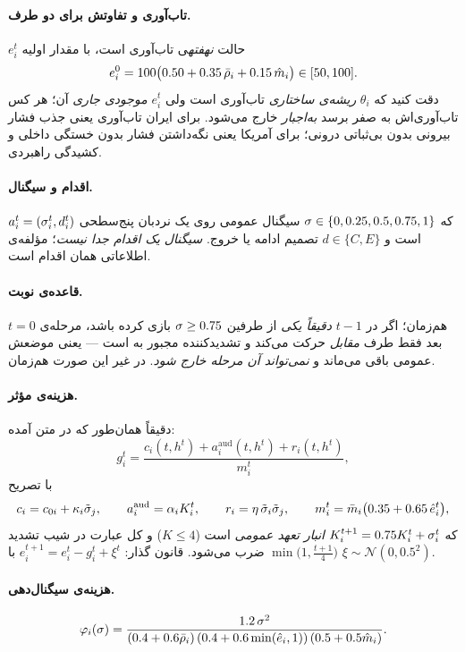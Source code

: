 \documentclass[12pt,a4paper]{article}
\begin{document}
\paragraph{تاب‌آوری و تفاوتش برای دو طرف.}
$e_i^t$ حالت \emph{نهفته}ی تاب‌آوری است، با مقدار اولیه
\[
  e_i^0=100\bigl(0.50+0.35\,\bar{\rho}_i+0.15\,\hat{m}_i\bigr)\in[50,100].
\]
دقت کنید که $\theta_i$ \emph{ریشه‌ی ساختاری} تاب‌آوری است ولی $e_i^t$
\emph{موجودی جاری} آن؛ هر کس تاب‌آوری‌اش به صفر برسد \emph{به‌اجبار} خارج
می‌شود. برای ایران تاب‌آوری یعنی جذب فشار بیرونی بدون بی‌ثباتی درونی؛ برای
آمریکا یعنی نگه‌داشتن فشار بدون خستگی داخلی و کشیدگی راهبردی.

\paragraph{اقدام و سیگنال.}
$a_i^t=(\sigma_i^t,d_i^t)$ که
$\sigma\in\{0,0.25,0.5,0.75,1\}$ سیگنال عمومی روی یک نردبان پنج‌سطحی است و
$d\in\{C,E\}$ تصمیم ادامه یا خروج. \emph{سیگنال یک اقدام جدا نیست}؛ مؤلفه‌ی
اطلاعاتی همان اقدام است.

\paragraph{قاعده‌ی نوبت.}
$t=0$ هم‌زمان؛ اگر در $t-1$ \emph{دقیقاً یکی} از طرفین $\sigma\ge0.75$ بازی کرده
باشد، مرحله‌ی بعد فقط طرف \emph{مقابل} حرکت می‌کند و تشدیدکننده مجبور به
 است — یعنی موضعش عمومی باقی می‌ماند و \emph{نمی‌تواند آن مرحله خارج
شود}. در غیر این صورت هم‌زمان.

\paragraph{هزینه‌ی مؤثر.} دقیقاً همان‌طور که در متن آمده:
\[
  g_i^t=\frac{c_i(t,h^t)+a_i^{\mathrm{aud}}(t,h^t)+r_i(t,h^t)}{m_i^t},
\]
با تصریح
\[
  c_i=c_{0i}+\kappa_i\tilde{\sigma}_j,\qquad
  a_i^{\mathrm{aud}}=\alpha_i K_i^t,\qquad
  r_i=\eta\,\tilde{\sigma}_i\tilde{\sigma}_j,\qquad
  m_i^t=\bar{m}_i\bigl(0.35+0.65\,\hat{e}_i^t\bigr),
\]
که $K_i^{t+1}=0.75K_i^t+\sigma_i^t$ \emph{انبار تعهد عمومی} است
(‏$K\le4$) و کل عبارت در شیب تشدید $\min\bigl(1,\tfrac{t+1}{4}\bigr)$ ضرب
می‌شود. قانون گذار:
$e_i^{t+1}=e_i^t-g_i^t+\xi^t$ با $\xi\sim\mathcal N(0,0.5^2)$.

\paragraph{هزینه‌ی سیگنال‌دهی.}
\[
  \varphi_i(\sigma)=\frac{1.2\,\sigma^2}
  {(0.4+0.6\bar{\rho}_i)\,(0.4+0.6\min(\hat{e}_i,1))\,(0.5+0.5\hat{m}_i)} .
\]
\end{document}
